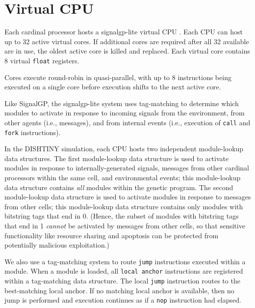 \section{Virtual CPU} \label{sec:virtual_cpu}

Each cardinal processor hosts a signalgp-lite virtual CPU \citep{lalejini2018evolving,moreno2021signalgp}.
Each CPU can host up to 32 active virtual cores.
If additional cores are required after all 32 available are in use, the oldest active core is killed and replaced.
Each virtual core contains 8 virtual \texttt{float} registers.

Cores execute round-robin in quasi-parallel, with up to 8 instructions being executed on a single core before execution shifts to the next active core.

Like SignalGP, the signalgp-lite system uses tag-matching to determine which modules to activate in response to incoming signals from the environment, from other agents (i.e., messages), and from internal events (i.e., execution of \texttt{call} and \texttt{fork} instructions).

In the DISHTINY simulation, each CPU hosts two independent module-lookup data structures.
The first module-lookup data structure is used to activate modules in response to internally-generated signals, messages from other cardinal processors within the same cell, and environmental events;
this module-lookup data structure contains \textit{all} modules within the genetic program.
The second module-lookup data structure is used to activate modules in response to messages from other cells;
this module-lookup data structure contains only modules with bitstring tags that end in 0.
(Hence, the subset of modules with bitstring tags that end in 1 \textit{cannot} be activated by messages from other cells, so that sensitive functionality like resource sharing and apoptosis can be protected from potentially malicious exploitation.)

We also use a tag-matching system to route \texttt{jump} instructions executed within a module.
When a module is loaded, all \texttt{local anchor} instructions are registered within a tag-matching data structure.
The local \texttt{jump} instruction routes to the best-matching local anchor.
If no matching local anchor is available, then no jump is performed and execution continues as if a \texttt{nop} instruction had elapsed.
